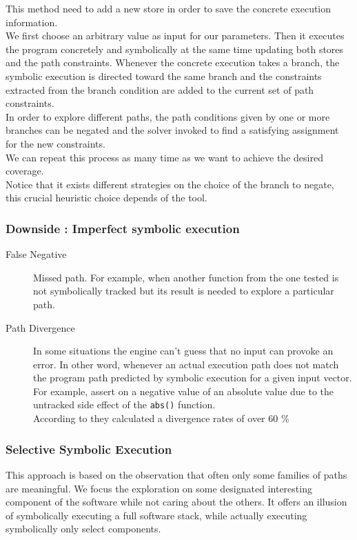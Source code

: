 \documentclass[11pt]{article}
\begin{document}
    			This method need to add a new store in order to save the concrete execution information.\\
    			We first choose an arbitrary value as input for our parameters. Then it executes the program concretely and symbolically at the same time updating both stores and the path constraints. Whenever the concrete execution takes a branch, the symbolic execution is directed toward the same branch and the constraints extracted from the branch condition are added to the current set of path constraints.\\
    			In order to explore different paths, the path conditions given by one or more branches can be negated and the solver invoked to find a satisfying assignment for the new constraints.\\
    			We can repeat this process as many time as we want to achieve the desired coverage.\\

    			Notice that it exists different strategies on the choice of the branch to negate, this crucial heuristic choice depends of the tool.\\

    		\subsubsection*{Downside : Imperfect symbolic execution}
    			\begin{description}
    				\item[False Negative] Missed path. For example, when another function from the one tested is not symbolically tracked but its result is needed to explore a particular path.
    				\item[Path Divergence] In some situations the engine can't guess that no input can provoke an error. In other word, whenever an actual execution path does not match the program path predicted by symbolic execution for a given input vector. For example, assert on a negative value of an absolute value due to the untracked side effect of the \texttt{abs()} function.\\
    				According to \cite{Godefroid2008AutomatedWF} they calculated a divergence rates of over 60 \%
    			\end{description}

    	\subsubsection{Selective Symbolic Execution}
    	\label{subsec:selectiveSymbolicExec}
    		This approach is based on the observation that often only some families of paths are meaningful\cite{chipounov2012s2e}. We focus the exploration on some designated interesting component of the software while not caring about the others. It offers an illusion of symbolically executing a full software stack, while actually executing symbolically only select components.\\
    		
\end{document}
